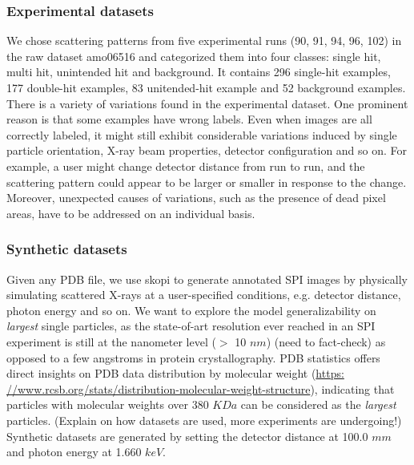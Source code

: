 
\subsubsection{Experimental datasets}


We chose scattering patterns from five experimental runs (90, 91, 94, 96, 102)
in the raw dataset amo06516 and categorized them into four classes: single hit,
multi hit, unintended hit and background.  It contains 296 single-hit examples,
177 double-hit examples, 83 unitended-hit example and 52 background examples.
There is a variety of variations found in the experimental dataset.  One
prominent reason is that some examples have wrong labels. Even when images are
all correctly labeled, it might still exhibit considerable variations induced by
single particle orientation, X-ray beam properties, detector configuration and
so on.  For example, a user might change detector distance from run to run, and
the scattering pattern could appear to be larger or smaller in response to the
change. Moreover, unexpected causes of variations, such as the presence of dead
pixel areas, have to be addressed on an individual basis.  



\subsubsection{Synthetic datasets}

Given any PDB file, we use skopi \cite{peckSkopiSimulationPackage2021} to
generate annotated SPI images by physically simulating scattered X-rays at a
user-specified conditions, e.g. detector distance, photon energy and so on. We
want to explore the model generalizability on \textit{largest} single particles,
as the state-of-art resolution ever reached in an SPI experiment is still at the
nanometer level ($>$ 10 $nm$) {\color{red}(need to fact-check)} as opposed to a
few angstroms in protein crystallography.  PDB statistics offers direct insights
on PDB data distribution by molecular weight (\url{https:
//www.rcsb.org/stats/distribution-molecular-weight-structure}), indicating that
particles with molecular weights over 380 $KDa$ can be considered as the
\textit{largest} particles.  {\color{red}(Explain on how datasets are used, more
experiments are undergoing!)} Synthetic datasets are generated by setting the
detector distance at 100.0 $mm$ and photon energy at 1.660 $keV$.  

